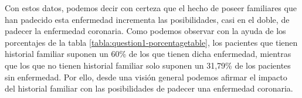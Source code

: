 \documentclass[a4paper, 9pt]{article}
\begin{document}
\vspace{3mm} 

Con estos datos, podemos decir con certeza que el hecho de poseer familiares que han padecido esta enfermedad incrementa las posibilidades, casi en el doble, de padecer la enfermedad coronaria. Como podemos observar con la ayuda de los porcentajes de la tabla \ref{tabla:question1-porcentagetable}, los pacientes que tienen historial familiar suponen un 60\% de los que tienen dicha enfermedad, mientras que los que no tienen historial familiar solo suponen un 31,79\% de los pacientes sin enfermedad. Por ello, desde una visión general podemos afirmar el impacto del historial familiar con las posibilidades de padecer una enfermedad coronaria.

\vspace{3mm}
\end{document}

